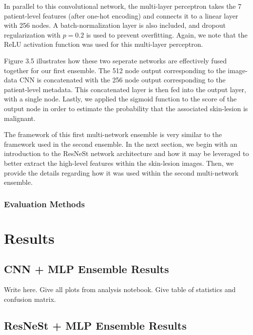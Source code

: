 \documentclass [MAS] {uclathes}
\begin{document}
In parallel to this convolutional network, the multi-layer perceptron takes the 7 patient-level features (after one-hot encoding) and connects it to a linear layer with 256 nodes. A batch-normalization layer is also included, and dropout regularization with $p=0.2$ is used to prevent overfitting. Again, we note that the ReLU activation function was used for this multi-layer perceptron. 


Figure 3.5 illustrates how these two seperate networks are effectively fused together for our first ensemble. The 512 node output corresponding to the image-data CNN is concatenated with the 256 node output corresponding to the patient-level metadata. This concatenated layer is then fed into the output layer, with a single node. Lastly, we applied the sigmoid function to the score of the output node in order to estimate the probability that the associated skin-lesion is malignant.

The framework of this first multi-network ensemble is very similar to the framework used in the second ensemble. In the next section, we begin with an introduction to the ResNeSt network architecture and how it may be leveraged to better extract the high-level features within the skin-lesion images. Then, we provide the details regarding how it was used within the second multi-network ensemble.

\subsection{Evaluation Methods}



\chapter{Results}


\section{CNN + MLP Ensemble Results}

Write here. Give all plots from analysis notebook. Give table of statistics and confusion matrix.

\section{ResNeSt + MLP Ensemble Results}
\end{document}
